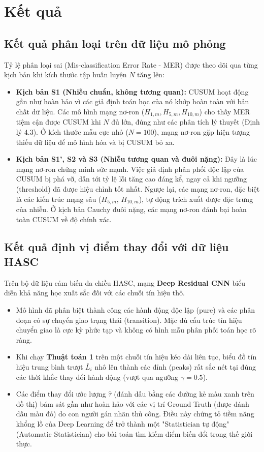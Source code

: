 \section{Kết quả}

\subsection{Kết quả phân loại trên dữ liệu mô phỏng}
Tỷ lệ phân loại sai (Mis-classification Error Rate - MER) được theo dõi qua từng kịch bản khi kích thước tập huấn luyện $N$ tăng lên:
\begin{itemize}
    \item \textbf{Kịch bản S1 (Nhiễu chuẩn, không tương quan):} CUSUM hoạt động gần như hoàn hảo vì các giả định toán học của nó khớp hoàn toàn với bản chất dữ liệu. Các mô hình mạng nơ-ron ($H_{1,m}, H_{5,m}, H_{10,m}$) cho thấy MER tiệm cận được CUSUM khi $N$ đủ lớn, đúng như các phân tích lý thuyết (Định lý 4.3). Ở kích thước mẫu cực nhỏ ($N=100$), mạng nơ-ron gặp hiện tượng thiếu dữ liệu để mô hình hóa và bị CUSUM bỏ xa.
    \item \textbf{Kịch bản S1', S2 và S3 (Nhiễu tương quan và đuôi nặng):} Đây là lúc mạng nơ-ron chứng minh sức mạnh. Việc giả định phân phối độc lập của CUSUM bị phá vỡ, dẫn tới tỷ lệ lỗi tăng cao đáng kể, ngay cả khi ngưỡng (threshold) đã được hiệu chỉnh tốt nhất. Ngược lại, các mạng nơ-ron, đặc biệt là các kiến trúc mạng sâu ($H_{5,m}$, $H_{10,m}$), tự động trích xuất được đặc trưng của nhiễu. Ở kịch bản Cauchy đuôi nặng, các mạng nơ-ron đánh bại hoàn toàn CUSUM về độ chính xác.
\end{itemize}

\subsection{Kết quả định vị điểm thay đổi với dữ liệu HASC}
Trên bộ dữ liệu cảm biến đa chiều HASC, mạng \textbf{Deep Residual CNN} biểu diễn khả năng học xuất sắc đối với các chuỗi tín hiệu thô.
\begin{itemize}
    \item Mô hình đã phân biệt thành công các hành động độc lập (pure) và các phân đoạn có sự chuyển giao trạng thái (transition). Mặc dù cấu trúc tín hiệu chuyển giao là cực kỳ phức tạp và không có hình mẫu phân phối toán học rõ ràng.
    \item Khi chạy \textbf{Thuật toán 1} trên một chuỗi tín hiệu kéo dài liên tục, biểu đồ tín hiệu trung bình trượt $\bar{L}_i$ nhô lên thành các đỉnh (peaks) rất sắc nét tại đúng các thời khắc thay đổi hành động (vượt qua ngưỡng $\gamma=0.5$). 
    \item Các điểm thay đổi ước lượng $\hat{\tau}$ (đánh dấu bằng các đường kẻ màu xanh trên đồ thị) bám sát gần như hoàn hảo với các vị trí Ground Truth (được đánh dấu màu đỏ) do con người gán nhãn thủ công. Điều này chứng tỏ tiềm năng khổng lồ của Deep Learning để trở thành một "Statistician tự động" (Automatic Statistician) cho bài toán tìm kiếm điểm biến đổi trong thế giới thực.
\end{itemize}
